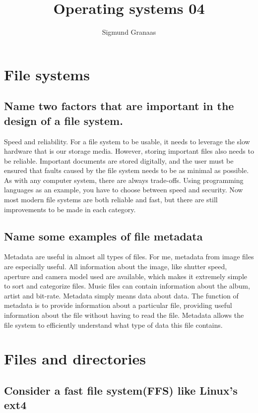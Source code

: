 \documentclass[a4paper]{article}
\title{Operating systems 04}
\author{Sigmund Granaas}
\begin{document}
\maketitle


\section{File systems}

\subsection{Name two factors that are important in the design of a file system.}

Speed and reliability. For a file system to be usable, it needs to leverage the slow hardware that is our storage media. However, storing important files also needs to be reliable. Important documents are stored digitally, and the user must be ensured that faults caused by the file system needs to be as minimal as possible. As with  any computer system, there are always trade-offs. Using programming languages as an example, you have to choose between speed and security. Now most modern file systems are both reliable and fast, but there are still improvements to be made in each category.

\subsection{Name some examples of file metadata}
Metadata are useful in almost all types of files. For me, metadata from image files are especially useful. All information about the image, like shutter speed, aperture and camera model used are available, which makes it extremely simple to sort and categorize files. Music files can contain information about the album, artist and bit-rate. Metadata simply means data about data. The function of metadata is to provide information about a particular file, providing useful information about the file without having to read the file. Metadata allows the file system to efficiently understand what type of data this file contains.



\section{Files and directories}



\subsection{Consider a fast file system(FFS) like Linux's ext4}
\end{document}

